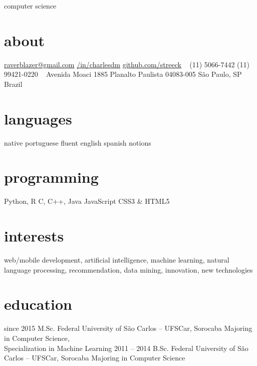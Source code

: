 \documentclass[]{friggeri-cv}
\begin{document}
       {computer science}


\begin{aside}
  \section{about}
    \href{mailto:raverblazer@gmail.com}{raverblazer@gmail.com}
    \href{http://www.linkedin.com/in/charlesdm}{\faLinkedinSign \space  /in/charlesdm}
    \href{https://github.com/streeck}{\faGithubSign \space github.com/streeck}
    ~
    (11) 5066-7442
    (11) 99421-0220
    ~
    Avenida Moaci 1885
    Planalto Paulista
    04083-005
    São Paulo, SP
    Brazil
  \section{languages}
    native portuguese
    fluent english
    spanish notions
  \section{programming}
    Python, R
    C, C++, Java
    JavaScript
    CSS3 \& HTML5
\end{aside}

\section{interests}

web/mobile development, artificial intelligence, machine learning, natural language processing, recommendation, data mining, innovation, new technologies

\section{education}

\begin{entrylist}
  \entry
    {since 2015}
    {M.Sc.}
    {Federal University of São Carlos -- UFSCar, Sorocaba}
    {Majoring in Computer Science,\\
    Specialization in Machine Learning}
  \entry
    {2011 – 2014}
    {B.Sc.}
    {Federal University of São Carlos -- UFSCar, Sorocaba}
    {Majoring in Computer Science}
\end{entrylist}
\end{document}
